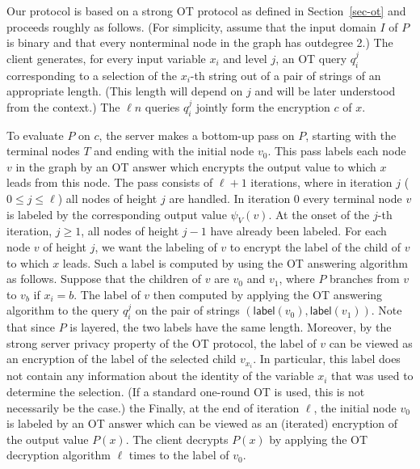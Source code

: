 \documentclass[11pt]{article}
\newcommand{\lab}{{\mathsf{label}}}
\begin{document}
Our protocol is based on a strong OT protocol as defined in
Section~\ref{sec-ot} and proceeds roughly as follows.  (For
simplicity, assume that the input domain $I$ of $P$ is binary and
that every nonterminal node in the graph has outdegree 2.) The
client generates, for every input variable $x_i$ and level $j$, an
OT query $q^j_i$ corresponding to a selection of the $x_i$-th
string out of a pair of strings of an appropriate length. (This
length will depend on $j$ and will be later understood from the
context.) The $\ell n$ queries $q^j_i$ jointly form the encryption
$c$ of $x$.

To evaluate $P$ on $c$, the server makes a bottom-up pass on $P$,
starting with the terminal nodes $T$ and ending with the initial
node $v_0$. This pass labels each node $v$ in the graph by an OT
answer which encrypts the output value to which $x$ leads from this
node. The pass consists of  $\ell+1$ iterations, where in iteration
$j$ ($0\le j\le \ell$) all nodes of height $j$ are handled. In
iteration 0 every terminal node $v$ is labeled by the corresponding
output value $\psi_V(v)$. At the onset of the $j$-th iteration,
$j\ge 1$, all nodes of height $j-1$ have already been labeled. For
each node $v$ of height $j$, we want the labeling of $v$ to encrypt
the label of the child of $v$ to which $x$ leads. Such a label is
computed by using the OT answering algorithm as follows. Suppose
that the children of $v$ are $v_0$ and $v_1$, where $P$ branches
from $v$ to $v_b$ if $x_i=b$. The label of $v$ then computed by
applying the OT answering algorithm to the query $q^j_i$ on the pair
of strings $(\lab(v_0),\lab(v_1))$. Note that since $P$ is layered,
the two labels have the same length. Moreover, by the strong server
privacy property of the OT protocol, the label of $v$ can be viewed
as an encryption of the label of the selected child $v_{x_i}$. In
particular, this label does not contain any information about the
identity of the variable $x_i$ that was used to determine the
selection. (If a standard one-round OT is used, this is not
necessarily be the case.)
the
Finally, at the end of iteration $\ell$, the initial node $v_0$ is
labeled by an OT answer which can be viewed as an (iterated)
encryption of the output value $P(x)$. The client decrypts $P(x)$
by applying the OT decryption algorithm $\ell$ times to the label
of $v_0$.
\end{document}
